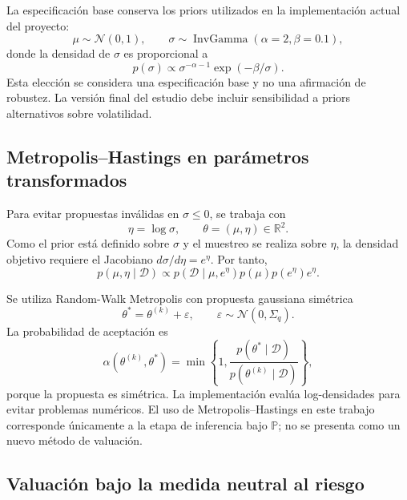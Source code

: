 \documentclass[12pt,letterpaper]{article}
\newcommand{\Pmeasure}{\mathbb{P}}
\begin{document}
La especificación base conserva los priors utilizados en la implementación actual del proyecto:
\begin{equation}
 \mu\sim\mathcal N(0,1),
 \qquad
 \sigma\sim\operatorname{InvGamma}(\alpha=2,\beta=0.1),
 \label{eq:priors}
\end{equation}
donde la densidad de $\sigma$ es proporcional a
\begin{equation}
 p(\sigma)\propto \sigma^{-\alpha-1}\exp(-\beta/\sigma).
\end{equation}
Esta elección se considera una especificación base y no una afirmación de robustez. La versión final del estudio debe incluir sensibilidad a priors alternativos sobre volatilidad.

\subsection{Metropolis--Hastings en parámetros transformados}

Para evitar propuestas inválidas en $\sigma\leq0$, se trabaja con
\begin{equation}
 \eta=\log\sigma,
 \qquad \theta=(\mu,\eta)\in\mathbb R^2.
\end{equation}
Como el prior está definido sobre $\sigma$ y el muestreo se realiza sobre $\eta$, la densidad objetivo requiere el Jacobiano $d\sigma/d\eta=e^\eta$. Por tanto,
\begin{equation}
 p(\mu,\eta\mid\mathcal D)
 \propto
 p(\mathcal D\mid\mu,e^\eta)
 p(\mu)
 p(e^\eta)
 e^\eta.
 \label{eq:posterior_eta}
\end{equation}

Se utiliza Random-Walk Metropolis con propuesta gaussiana simétrica
\begin{equation}
 \theta^{*}=\theta^{(k)}+\varepsilon,
 \qquad
 \varepsilon\sim\mathcal N(0,\Sigma_q).
\end{equation}
La probabilidad de aceptación es
\begin{equation}
 \alpha(\theta^{(k)},\theta^*)
 =\min\left\{1,
 \frac{p(\theta^*\mid\mathcal D)}{p(\theta^{(k)}\mid\mathcal D)}
 \right\},
\end{equation}
porque la propuesta es simétrica. La implementación evalúa log-densidades para evitar problemas numéricos. El uso de Metropolis--Hastings en este trabajo corresponde únicamente a la etapa de inferencia bajo $\Pmeasure$; no se presenta como un nuevo método de valuación.

\subsection{Valuación bajo la medida neutral al riesgo}
\end{document}
